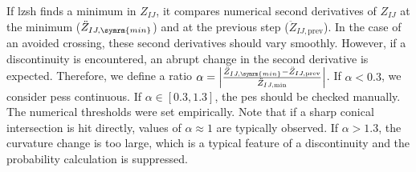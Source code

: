 If \acrshort{lzsh} finds a minimum in $Z_{IJ}$, it compares numerical second derivatives of $Z_{IJ}$ at the minimum ($\ddot Z_{IJ,\symrm{min}}$) and at the previous step ($\ddot Z_{IJ,\mathrm{prev}}$). In the case of an avoided crossing, these second derivatives should vary smoothly. However, if a discontinuity is encountered, an abrupt change in the second derivative is expected. Therefore, we define a ratio $\alpha=\left\lvert\frac{\ddot Z_{IJ,\symrm{min}}-\ddot Z_{IJ,\mathrm{prev}}}{\ddot Z_{IJ,\mathrm{min}}}\right\rvert$. If $\alpha<0.3$, we consider \glspl{pes} continuous. If $\alpha\in[0.3,1.3]$, the \acrshort{pes} should be checked manually. The numerical thresholds were set empirically. Note that if a sharp conical intersection is hit directly, values of $\alpha\approx1$ are typically observed. If $\alpha>1.3$, the curvature change is too large, which is a typical feature of a discontinuity and the probability calculation is suppressed.\supercite{10.1021/acs.jctc.5c01176}
